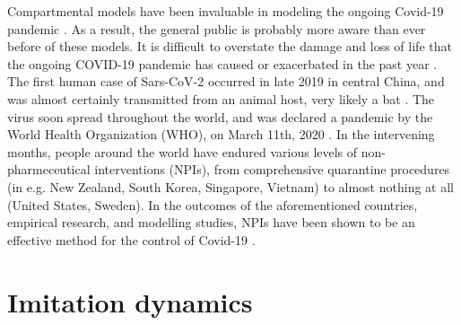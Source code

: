 Compartmental models have been invaluable in modeling the ongoing Covid-19 pandemic \cite{thompson2020epidemiological}. As a result, the general public is probably more aware than ever before of these models. It is difficult to overstate the damage and loss of life that the ongoing COVID-19 pandemic has caused or exacerbated in the past year \cite{miller2020disease,who2021impact}. The first human case of Sars-CoV-2 occurred in late 2019 in central China, and was almost certainly transmitted from an animal host, very likely a bat \cite{andersen2020proximal,rasmussen2021origins,zhu2020novel}. The virus soon spread throughout the world, and was declared a pandemic by the World Health Organization (WHO), on March 11th, 2020 \cite{who2020announces}. In the intervening months, people around the world have endured various levels of non-pharmeceutical interventions (NPIs), from comprehensive quarantine procedures (in e.g. New Zealand, South Korea, Singapore, Vietnam) to almost nothing at all (United States, Sweden). In the outcomes of the aforementioned countries, empirical research, and modelling studies, NPIs have been shown to be an effective method for the control of Covid-19 \cite{anderson2020estimating,flaxman2020estimating,ferguson2020report,demirguc2020sooner}. 



\section{Imitation dynamics}


